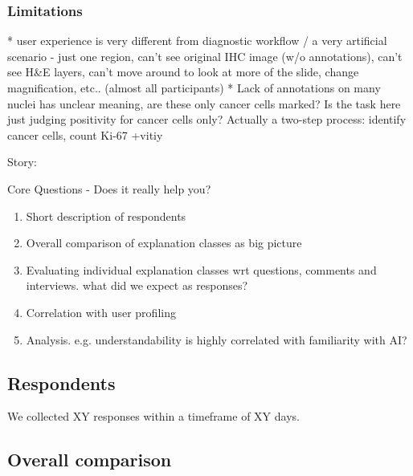 \subsubsection{Limitations}
* user experience is very different from diagnostic workflow / a very artificial scenario - just one region, can't see original IHC image (w/o annotations), can't see H\&E layers, can't move around to look at more of the slide, change magnification, etc.. (almost all participants)
* Lack of annotations on many nuclei has unclear meaning, are these only cancer cells marked? Is the task here just judging positivity for cancer cells only? Actually a two-step process: identify cancer cells, count Ki-67 +vitiy

Story:

Core Questions - Does it really help you?

\begin{enumerate}
    \item Short description of respondents
    \item Overall comparison of explanation classes as big picture
    \item Evaluating individual explanation classes wrt questions, comments and interviews. what did we expect as responses?
    \item Correlation with user profiling
    \item Analysis. e.g. understandability is highly correlated with familiarity with AI?
\end{enumerate}


\subsection{Respondents}
We collected XY responses within a timeframe of XY days. 

\subsection{Overall comparison}


